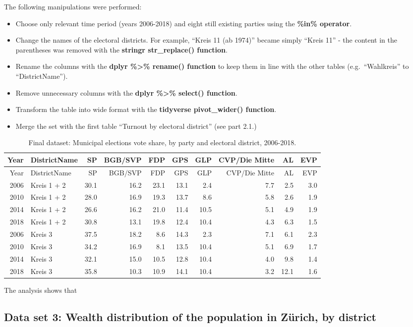 \documentclass[
]{article}
\providecommand{\tightlist}{%
  \setlength{\itemsep}{0pt}\setlength{\parskip}{0pt}}
\begin{document}
The following manipulations were performed:

\begin{itemize}
\tightlist
\item
  Choose only relevant time period (years 2006-2018) and eight still
  existing parties using the \textbf{\%in\% operator}.
\item
  Change the names of the electoral districts. For example, ``Kreis 11
  (ab 1974)'' became simply ``Kreis 11'' - the content in the
  parentheses was removed with the \textbf{stringr str\_replace()
  function}.
\item
  Rename the columns with the \textbf{dplyr \%\textgreater\% rename()
  function} to keep them in line with the other tables
  (e.g.~``Wahlkreis'' to ``DistrictName'').
\item
  Remove unnecessary columns with the \textbf{dplyr \%\textgreater\%
  select() function}.
\item
  Transform the table into wide format with the \textbf{tidyverse
  pivot\_wider() function}.
\item
  Merge the set with the first table ``Turnout by electoral district''
  (see part 2.1.)
\end{itemize}

\begin{longtable}[]{@{}rlrrrrrrrr@{}}
\caption{Final dataset: Municipal elections vote share, by party and
electoral district, 2006-2018.}\tabularnewline
\toprule
Year & DistrictName & SP & BGB/SVP & FDP & GPS & GLP & CVP/Die Mitte &
AL & EVP\tabularnewline
\midrule
\endfirsthead
\toprule
Year & DistrictName & SP & BGB/SVP & FDP & GPS & GLP & CVP/Die Mitte &
AL & EVP\tabularnewline
\midrule
\endhead
2006 & Kreis 1 + 2 & 30.1 & 16.2 & 23.1 & 13.1 & 2.4 & 7.7 & 2.5 &
3.0\tabularnewline
2010 & Kreis 1 + 2 & 28.0 & 16.9 & 19.3 & 13.7 & 8.6 & 5.8 & 2.6 &
1.9\tabularnewline
2014 & Kreis 1 + 2 & 26.6 & 16.2 & 21.0 & 11.4 & 10.5 & 5.1 & 4.9 &
1.9\tabularnewline
2018 & Kreis 1 + 2 & 30.8 & 13.1 & 19.8 & 12.4 & 10.4 & 4.3 & 6.3 &
1.5\tabularnewline
2006 & Kreis 3 & 37.5 & 18.2 & 8.6 & 14.3 & 2.3 & 7.1 & 6.1 &
2.3\tabularnewline
2010 & Kreis 3 & 34.2 & 16.9 & 8.1 & 13.5 & 10.4 & 5.1 & 6.9 &
1.7\tabularnewline
2014 & Kreis 3 & 32.1 & 15.0 & 10.5 & 12.8 & 10.4 & 4.0 & 9.8 &
1.4\tabularnewline
2018 & Kreis 3 & 35.8 & 10.3 & 10.9 & 14.1 & 10.4 & 3.2 & 12.1 &
1.6\tabularnewline
\bottomrule
\end{longtable}

The analysis shows that

\hypertarget{data-set-3-wealth-distribution-of-the-population-in-zuxfcrich-by-district}{%
\subsection{Data set 3: Wealth distribution of the population in Zürich,
by
district}\label{data-set-3-wealth-distribution-of-the-population-in-zuxfcrich-by-district}}
\end{document}
